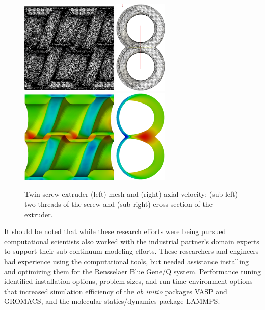 \begin{figure} \centering
  \includegraphics[height=4.5cm,keepaspectratio]{figures/tseMeshTwoThreads.png}
  \includegraphics[height=4.5cm,keepaspectratio]{figures/tseMeshCrossSection.png}
  \includegraphics[height=4.5cm,keepaspectratio]{figures/tseFlowTwoThreads.png}
  \includegraphics[height=4.5cm,keepaspectratio]{figures/tseFlowCrossSection.png}
  \caption{
    Twin-screw extruder (left) mesh and (right) axial velocity: (sub-left) two
    threads of the screw and (sub-right) cross-section of the extruder.
  }
  \label{fig:tseMeshAndFlow}
\end{figure}

It should be noted that while these research efforts were being pursued
computational scientists also worked with the industrial partner's domain experts
to support their sub-continuum modeling efforts.
These researchers and engineers had experience using the computational tools,
but needed assistance installing and optimizing them for the Rensselaer Blue
Gene/Q system.
Performance tuning identified installation options, problem sizes, and run time
environment options that increased simulation efficiency of the
\textit{ab initio} packages VASP and GROMACS, and the molecular statics/dynamics
package LAMMPS.

